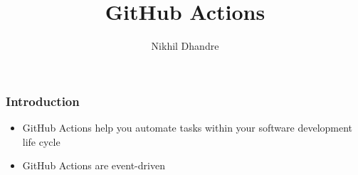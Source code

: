 \documentclass[gray]{beamer}
\begin{document}
\sffamily
\bfseries

\title[GitHub Actions]{GitHub Actions}
\author[\insertframenumber-\inserttotalframenumber \hspace{3cm} digitronik]{Nikhil Dhandre}

\begin{frame}
  \titlepage
\end{frame}

\begin{frame}
 \frametitle{Introduction}

 \href{https://docs.github.com/en/free-pro-team@latest/actions}{}


 \begin{itemize}
  \item GitHub Actions help you automate tasks within your software development life cycle
  \item GitHub Actions are event-driven
 \end{itemize}
\end{frame}
\end{document}
